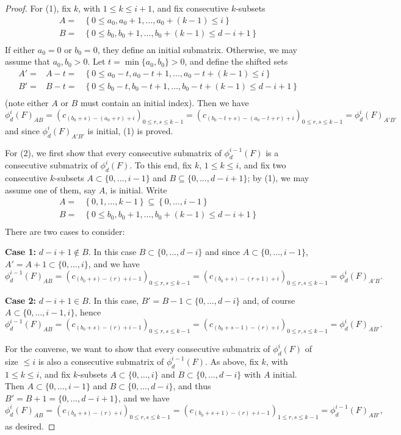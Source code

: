 \documentclass[unnumsec,webpdf,modern,medium]{oup-authoring-template}
\theoremstyle{theorem}
\theoremstyle{definition}
\begin{document}
\begin{proof}
	For (1), fix $k$, with $1\leq k\leq i+1$, and fix consecutive $k$-subsets
	$$\begin{array}{ll}
		A= & \left\{0\leq a_0, a_0+1,\ldots,a_0+(k-1)\leq i\right\}\\
		B= & \left\{0\leq b_0,b_0+1,\ldots,b_0+(k-1)\leq d-i+1\right\}\\
		\end{array}$$
	If either $a_0=0$ or $b_0=0$, they define an initial submatrix.  Otherwise, we may assume that $a_0,b_0>0$.  Let $t=\min\{a_0,b_0\}>0$, and define the shifted sets 
	$$\begin{array}{lll}
		A'= & A-t= & \left\{0\leq a_0-t, a_0-t+1,\ldots,a_0-t+(k-1)\leq i\right\}\\
		B'= & B-t= & \left\{0\leq b_0-t,b_0-t+1,\ldots,b_0-t+(k-1)\leq d-i+1\right\}\\
	\end{array}$$
	(note either $A$ or $B$ must contain an initial index).
	Then we have 
	$$\phi^i_d(F)_{AB}=\left(c_{(b_0+s)-(a_0+r)+i}\right)_{0\leq r,s\leq k-1}=\left(c_{(b_0-t+s)-(a_0-t+r)+i}\right)_{0\leq r,s\leq k-1}=\phi^i_d(F)_{A'B'}$$
	and since $\phi^i_d(F)_{A'B'}$ is initial, (1) is proved.
	
	For (2), we first show that every consecutive submatrix of $\phi^{i-1}_d(F)$ is a consecutive submatrix of $\phi^i_d(F)$.  To this end, fix $k$, $1\leq k\leq i$, and fix two consecutive $k$-subsets $A\subset\{0,\ldots,i-1\}$ and $B\subseteq\{0,\ldots,d-i+1\}$; by (1), we may assume one of them, say $A$, is initial.  Write
	$$\begin{array}{ll}
		A= & \left\{0,1,\ldots,k-1\right\}\subseteq \left\{0,\ldots,i-1\right\}\\
		B= & \left\{0\leq b_0,b_0+1,\ldots,b_0+(k-1)\leq d-i+1\right\}\\
	\end{array}$$
	There are two cases to consider:
	
	\textbf{Case 1:}  $d-i+1\notin B$.  In this case $B\subset\{0,\ldots,d-i\}$ and since $A\subset\{0,\ldots,i-1\}$, $A'=A+1\subset\{0,\ldots,i\}$, and we have
	$$\phi^{i-1}_d(F)_{AB}=\left(c_{(b_0+s)-(r)+i-1}\right)_{0\leq r,s\leq k-1}=\left(c_{(b_0+s)-(r+1)+i}\right)_{0\leq r,s\leq k-1}=\phi^{i}_d(F)_{A'B}.$$
	
	\textbf{Case 2:} $d-i+1\in B$.  In this case, $B'=B-1\subset\{0,\ldots,d-i\}$ and, of course $A\subset\{0,\ldots,i-1,i\}$, hence
	\[
	\phi^{i-1}_d(F)_{AB}=\left(c_{(b_0+s)-(r)+i-1}\right)_{0\leq r,s\leq k-1}=\left(c_{(b_0+s-1)-(r)+i}\right)_{0\leq r,s\leq k-1}=\phi^{i}_d(F)_{AB'}.
	\]
	
	For the converse, we want to show that every consecutive submatrix of $\phi^i_d(F)$ of size $\leq i$ is also a consecutive submatrix of $\phi^{i-1}_d(F)$.  As above, fix $k$, with $1\leq k\leq i$, and fix $k$-subsets $A\subset\{0,\ldots,i\}$ and $B\subset\{0,\ldots,d-i\}$ with $A$ initial.  Then $A\subset\{0,\ldots,i-1\}$ and $B\subset\{0,\ldots,d-i\}$, and thus $B'=B+1=\{0,\ldots,d-i+1\}$, and we have 
	$$\phi^i_d(F)_{AB}=\left(c_{(b_0+s)-(r)+i}\right)_{0\leq r,s\leq k-1}=\left(c_{(b_0+s+1)-(r)+i-1}\right)_{1\leq r,s\leq k-1}=\phi^{i-1}_d(F)_{AB'},$$
	as desired.  
\end{proof} 
\end{document}
